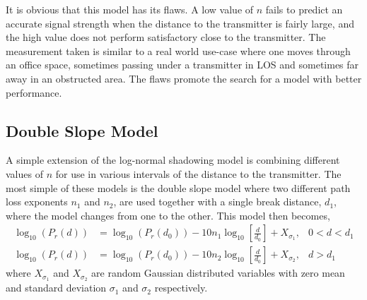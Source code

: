 \documentclass{LTHthesis}
\begin{document}
It is obvious that this model has its flaws. A low value of $n$ fails to predict an accurate signal strength when the distance to the transmitter is fairly large, and the high value does not perform satisfactory close to the transmitter. The measurement taken is similar to a real world use-case where one moves through an office space, sometimes passing under a transmitter in LOS and sometimes far away in an obstructed area. The flaws promote the search for a model with better performance.
%
\subsection{Double Slope Model}
%
A simple extension of the log-normal shadowing model is combining different values of $n$ for use in various intervals of the distance to the transmitter. The most simple of these models is the double slope model where two different path loss exponents $n_1$ and $n_2$, are used together with a single break distance, $d_1$, where the model changes from one to the other. This model then becomes,
\begin{subequations}
\begin{align}
\log_{10}({P_r(d)})&=\log_{10}({P_r(d_0)})-10n_1\log_{10}\left[{\frac{d}{d_0}}\right] + X_{\sigma_1}, & 0<d<d_1\\
\log_{10}({P_r(d)})&=\log_{10}({P_r(d_0)})-10n_2\log_{10}\left[{\frac{d}{d_0}}\right] + X_{\sigma_2}, & d>d_1
\end{align}
\end{subequations} 
where $X_{\sigma_1}$ and $X_{\sigma_2}$ are random Gaussian distributed variables with zero mean and standard deviation $\sigma_1$ and $\sigma_2$ respectively.
 
\end{document}
